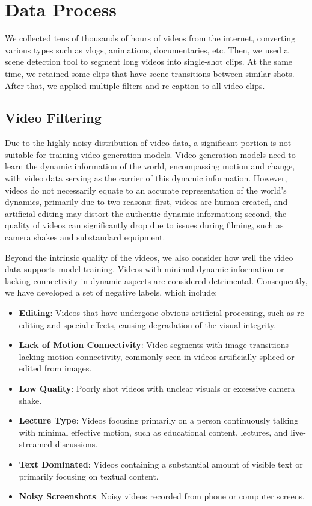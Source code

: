 \section{Data Process}

We collected tens of thousands of hours of videos from the internet, converting various types such as vlogs, animations, documentaries, etc. Then, we used a scene detection tool to segment long videos into single-shot clips. At the same time, we retained some clips that have scene transitions between similar shots. After that, we applied multiple filters and re-caption to all video clips.

\subsection{Video Filtering}

Due to the highly noisy distribution of video data, a significant portion is not suitable for training video generation models. Video generation models need to learn the dynamic information of the world, encompassing motion and change, with video data serving as the carrier of this dynamic information. However, videos do not necessarily equate to an accurate representation of the world's dynamics, primarily due to two reasons: first, videos are human-created, and artificial editing may distort the authentic dynamic information; second, the quality of videos can significantly drop due to issues during filming, such as camera shakes and substandard equipment.

Beyond the intrinsic quality of the videos, we also consider how well the video data supports model training. Videos with minimal dynamic information or lacking connectivity in dynamic aspects are considered detrimental. Consequently, we have developed a set of negative labels, which include:

\begin{itemize}
    \item \textbf{Editing}: Videos that have undergone obvious artificial processing, such as re-editing and special effects, causing degradation of the visual integrity.
    \item \textbf{Lack of Motion Connectivity}: Video segments with image transitions lacking motion connectivity, commonly seen in videos artificially spliced or edited from images.
    \item \textbf{Low Quality}: Poorly shot videos with unclear visuals or excessive camera shake.
    \item \textbf{Lecture Type}: Videos focusing primarily on a person continuously talking with minimal effective motion, such as educational content, lectures, and live-streamed discussions.
    \item \textbf{Text Dominated}: Videos containing a substantial amount of visible text or primarily focusing on textual content.
    \item \textbf{Noisy Screenshots}: Noisy videos recorded from phone or computer screens.
\end{itemize}

